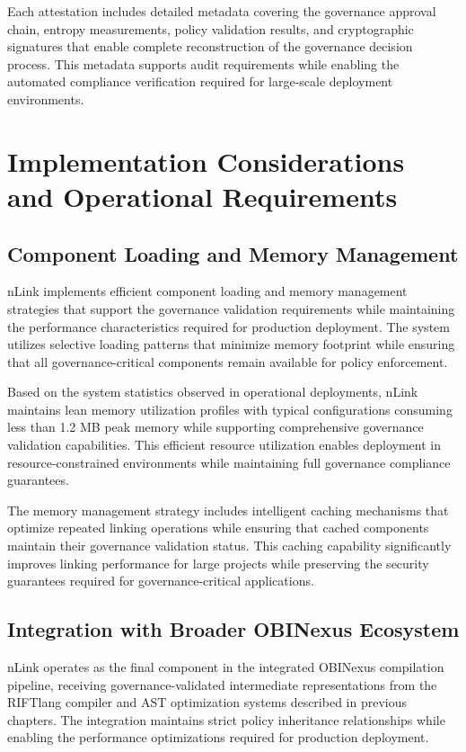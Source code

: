 Each attestation includes detailed metadata covering the governance approval chain, entropy measurements, policy validation results, and cryptographic signatures that enable complete reconstruction of the governance decision process. This metadata supports audit requirements while enabling the automated compliance verification required for large-scale deployment environments.

\section{Implementation Considerations and Operational Requirements}

\subsection{Component Loading and Memory Management}

nLink implements efficient component loading and memory management strategies that support the governance validation requirements while maintaining the performance characteristics required for production deployment. The system utilizes selective loading patterns that minimize memory footprint while ensuring that all governance-critical components remain available for policy enforcement.

Based on the system statistics observed in operational deployments, nLink maintains lean memory utilization profiles with typical configurations consuming less than 1.2 MB peak memory while supporting comprehensive governance validation capabilities. This efficient resource utilization enables deployment in resource-constrained environments while maintaining full governance compliance guarantees.

The memory management strategy includes intelligent caching mechanisms that optimize repeated linking operations while ensuring that cached components maintain their governance validation status. This caching capability significantly improves linking performance for large projects while preserving the security guarantees required for governance-critical applications.

\subsection{Integration with Broader OBINexus Ecosystem}

nLink operates as the final component in the integrated OBINexus compilation pipeline, receiving governance-validated intermediate representations from the RIFTlang compiler and AST optimization systems described in previous chapters. The integration maintains strict policy inheritance relationships while enabling the performance optimizations required for production deployment.

